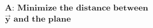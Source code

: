 \documentclass[preview]{standalone}
\begin{document}
\begin{align*}
\textbf{A:} \,\, \textbf{Minimize} \,\, \textbf{the distance between} \\ \mathbf{\vec{y}} \,\, \textbf{and the} \,\, \textbf{plane}
\end{align*}
\end{document}
